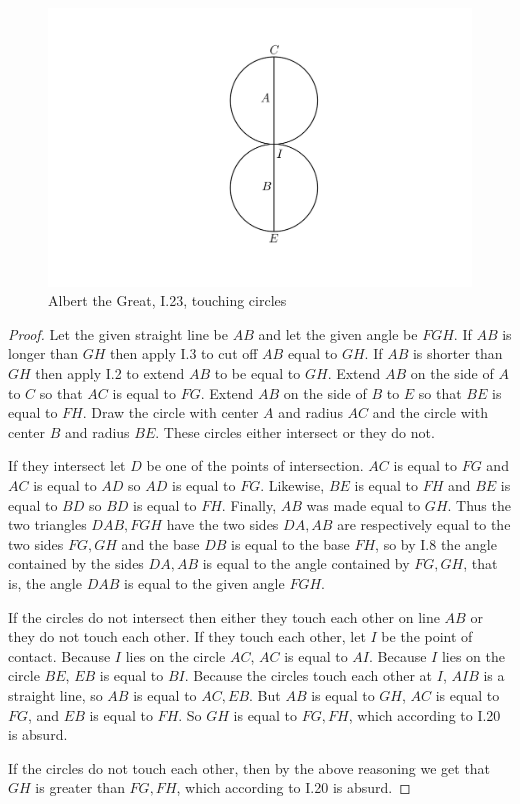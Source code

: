 \documentclass{article}
\begin{document}
\begin{figure}
\begin{center}
\includegraphics[width=\textwidth]{albertI23b.png}
\end{center}
\caption{Albert the Great, I.23, touching circles}
\label{albertI23b}
\end{figure}

\begin{proof} 
Let the given straight line be $AB$ and let the given angle be $FGH$.
If $AB$ is longer than $GH$ then apply I.3 to cut off $AB$ equal to $GH$.
If $AB$ is shorter than $GH$ then apply I.2 to extend $AB$ to be equal to $GH$.
Extend $AB$ on the side of $A$ to $C$ so that $AC$ is equal to $FG$.
Extend $AB$ on the side of $B$ to $E$ so that $BE$ is equal to $FH$.
Draw the circle with center $A$ and radius $AC$ and the circle with center $B$ and radius $BE$.
These circles either intersect or they do not.

If they intersect let $D$ be one of the points of intersection. 
$AC$ is equal to $FG$ and $AC$ is equal to $AD$ so $AD$ is equal to $FG$. 
Likewise, $BE$ is equal to $FH$ and $BE$ is equal to $BD$ so $BD$ is equal to $FH$.
Finally, $AB$ was made equal to $GH$. Thus the two triangles $DAB,FGH$ have the two
sides  $DA,AB$ are respectively equal to the two sides $FG,GH$ and the 
base $DB$ is equal to the base $FH$, so by I.8 the angle contained by the sides $DA,AB$ is equal to the angle
contained by $FG,GH$, that is, the angle $DAB$ is equal to the given angle $FGH$.

If the circles do not intersect then either they touch each other on line $AB$ or they do not touch each other.
If they touch each other, let $I$ be the point of contact.
Because $I$ lies on the circle $AC$, $AC$ is equal to $AI$. Because $I$ lies on the circle
$BE$, $EB$ is equal to $BI$.
Because the circles touch each other at $I$, $AIB$ is a straight line, so $AB$ is equal to $AC,EB$.
But $AB$ is equal to $GH$, $AC$ is equal to $FG$, and $EB$ is equal to $FH$. So $GH$ is equal to $FG,FH$, which according
to I.20 is absurd. 

If the circles do not touch each other, then by the above reasoning we get that $GH$ is greater than $FG,FH$, which according
to I.20 is absurd.
\end{proof}
\end{document}
